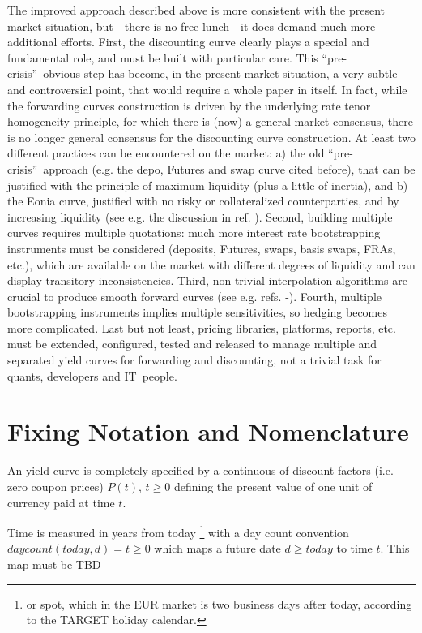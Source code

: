 \documentclass[11pt,reqno]{amsart}
\begin{document}
The improved approach described above is more consistent with the present market situation, but - there is no free lunch - it does demand much more additional efforts. First, the discounting curve clearly plays a special and fundamental role, and must be built with particular care. This \textquotedblleft pre-crisis\textquotedblright\ obvious step has become, in the present market situation, a very subtle and controversial point, that would require a whole paper in itself. In fact, while the forwarding curves construction is driven by the underlying rate tenor homogeneity principle, for which there is (now) a general market consensus, there is no longer general consensus for the discounting curve construction. At least two different practices can be encountered on the market: a) the old
\textquotedblleft pre-crisis\textquotedblright\ approach (e.g. the depo, Futures and swap curve cited before), that can be justified with the principle of maximum liquidity (plus a little of inertia), and b) the Eonia curve, justified with no risky or collateralized counterparties, and by increasing liquidity (see e.g. the discussion in ref. \cite{Mad08}).
Second, building multiple curves requires multiple quotations: much more interest rate bootstrapping instruments must be considered (deposits, Futures, swaps, basis swaps, FRAs, etc.), which are available on the market with different degrees of liquidity and can display transitory inconsistencies.
Third, non trivial interpolation algorithms are crucial to produce smooth forward curves (see e.g. refs. \cite{HagWes08}-\cite{And07}).
Fourth, multiple bootstrapping instruments implies multiple sensitivities, so hedging becomes more complicated. Last but not least, pricing libraries, platforms, reports, etc. must be extended, configured, tested and released to manage multiple and separated yield curves for forwarding and discounting, not a trivial task for quants, developers and IT\ people.


\section{\label{SecMath}Fixing Notation and Nomenclature}
An yield curve is completely specified by a continuous of discount factors (i.e. zero coupon prices) $P(t) $, $t\geq 0$ defining the present value of one unit of currency paid at time $t$.

Time is measured in years from today \footnote{or spot, which in the EUR market is two business days after today, according to the TARGET holiday calendar.} with a day count convention $daycount\left(
today,d\right) =t\geq 0$ which maps a future date $d\geq today$ to time $t$.
This map must be TBD
\end{document}
